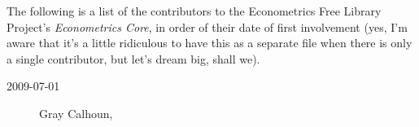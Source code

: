 


\noindent%
The following is a list of the contributors to the Econometrics Free
Library Project's \textit{Econometrics Core}, in order of their date
of first involvement (yes, I'm aware that it's a little ridiculous to
have this as a separate file when there is only a single contributor,
but let's dream big, shall we).

\begin{description}
\item[2009-07-01] Gray Calhoun, 
\end{description}